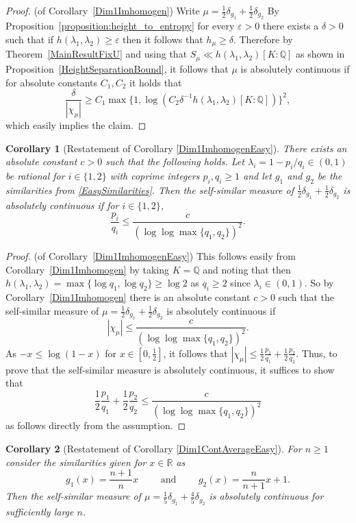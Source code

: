 \documentclass[10pt, english,oneside,reqno]{amsart}
\newtheorem*{corollary*}{Corollary}
\theoremstyle{plain}
\theoremstyle{remark}
\numberwithin{equation}{section}
\numberwithin{figure}{section}
\newcommand{\eps}{\varepsilon}
\newcommand{\Q}{\mathbb{Q}}
\newcommand{\R}{\mathbb{R}}
\begin{document}
\begin{proof}(of Corollary~\ref{Dim1Imhomogen})
    Write $\mu = \frac{1}{2}\delta_{g_1} + \frac{1}{2}\delta_{g_2}$ By Proposition~\ref{proposition:height_to_entropy} for every $\eps > 0$ there exists a $\delta > 0$ such that if $h(\lambda_1,\lambda_2) \geq \eps$ then it follows that $h_{\mu} \geq \delta$. Therefore by Theorem~\ref{MainResultFixU} and  using that $S_{\mu} \ll h(\lambda_1,\lambda_2) [K:\Q]$ as shown in Proposition~\ref{HeightSeparationBound}, it follows that $\mu$ is absolutely continuous if for absolute constants $C_1,C_2$ it holds that $$\frac{\delta}{|\chi_{\mu}|} \geq C_1 \max \{ 1, \log (C_2\delta^{-1}h(\lambda_1,\lambda_2) [K:\Q] ) \}^2,$$ which easily implies the claim. 
\end{proof}

\begin{corollary*}[Restatement of Corollary \ref{Dim1ImhomogenEasy}]
		There exists an absolute constant $c > 0$ such that the following holds. Let $\lambda_i = 1 - p_i/q_i \in (0,1)$ be rational for $i \in \{1,2 \}$ with coprime integers $p_i, q_i \geq 1$ and let $g_1$ and $g_2$ be the similarities from \eqref{EasySimilarities}. Then the self-similar measure of $\frac{1}{2}\delta_{g_1} + \frac{1}{2}\delta_{g_2}$ is absolutely continuous if for $i \in \{ 1,2 \}$, $$\frac{p_i}{q_i}\leq \frac{c}{(\log \log \max\{q_1, q_2\})^2}.$$
	\end{corollary*}

\begin{proof}(of Corollary~\ref{Dim1ImhomogenEasy})
This follows easily from Corollary~\ref{Dim1Imhomogen} by taking $K = \Q$ and noting that then $h(\lambda_1, \lambda_2) = \max\{ \log q_1, \log q_2\} \geq \log 2$ as $q_i \geq 2$ since $\lambda_i \in (0,1)$. So by Corollary~\ref{Dim1Imhomogen} there is an absolute constant $c >  0$ such that the self-similar measure of $\mu = \frac{1}{2}\delta_{g_1} + \frac{1}{2}\delta_{g_2}$ is absolutely continuous if $$|\chi_{\mu}| \leq \frac{c}{(\log \log \max\{ q_1, q_2\})^2}.$$ As $-x \leq \log (1-x)$ for $x \in [0,\frac{1}{2}]$, it follows that $|\chi_{\mu}| \leq \frac{1}{2}\frac{p_1}{q_1} + \frac{1}{2}\frac{p_2}{q_2}$. Thus, to prove that the self-similar measure is absolutely continuous, it suffices to show that $$\frac{1}{2}\frac{p_1}{q_1} + \frac{1}{2}\frac{p_2}{q_2} \leq\frac{c}{(\log \log \max\{ q_1, q_2\})^2}$$ as follows directly from the assumption.
\end{proof}

    \begin{corollary*}[Restatement of Corollary \ref{Dim1ContAverageEasy}]
		For $n\geq 1$ consider the similarities given for $x\in \R$ as $$g_1(x) = \frac{n + 1}{n} x \quad\quad \text{ and } \quad\quad g_2(x) = \frac{n}{n+ 1} x + 1.$$ Then the self-similar measure of $\mu = \frac{1}{5}\delta_{g_1} + \frac{4}{5}\delta_{g_2}$ is absolutely continuous for sufficiently large $n$. 
	\end{corollary*}
\end{document}
